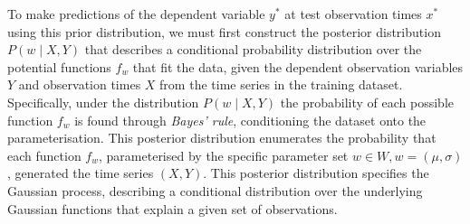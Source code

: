 \documentclass[a4paper, 11pt]{article}
\begin{document}
    To make predictions of the dependent variable $y^*$ at test observation times $x^*$ using this prior distribution, we must first construct the posterior distribution $P(w \mid X, Y)$ that describes a conditional probability distribution over the potential functions $f_w$ that fit the data, given the dependent observation variables $Y$ and observation times $X$ from the time series in the training dataset. Specifically, under the distribution $P(w \mid X, Y)$ the probability of each possible function $f_w$ is found through \emph{Bayes’ rule}, conditioning the dataset onto the parameterisation. This posterior distribution enumerates the probability that each function $f_w$, parameterised by the specific parameter set $w \in W, w = (\mu, \sigma)$, generated the time series $(X, Y)$. This posterior distribution specifies the Gaussian process, describing a conditional distribution over the underlying Gaussian functions that explain a given set of observations.

    
\end{document}
